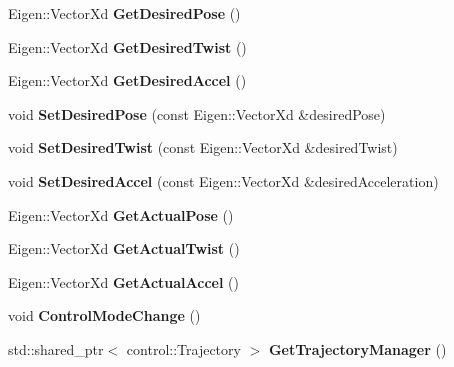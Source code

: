 \begin{DoxyCompactItemize}
Eigen\+::\+Vector\+Xd {\bfseries Get\+Desired\+Pose} ()
\item 
\mbox{\label{classproc__control_1_1_robot_state_ad4e53481ed7a527dd14cb38b14c5f3e2}} 
Eigen\+::\+Vector\+Xd {\bfseries Get\+Desired\+Twist} ()
\item 
\mbox{\label{classproc__control_1_1_robot_state_a4d4b5d2c9d2a52dd74f96379142a0517}} 
Eigen\+::\+Vector\+Xd {\bfseries Get\+Desired\+Accel} ()
\item 
\mbox{\label{classproc__control_1_1_robot_state_a3104336143109ecbc3e959685fdeb4a2}} 
void {\bfseries Set\+Desired\+Pose} (const Eigen\+::\+Vector\+Xd \&desired\+Pose)
\item 
\mbox{\label{classproc__control_1_1_robot_state_a77153e9de4974df397888c7d282a1b68}} 
void {\bfseries Set\+Desired\+Twist} (const Eigen\+::\+Vector\+Xd \&desired\+Twist)
\item 
\mbox{\label{classproc__control_1_1_robot_state_a44dfd68347df8a8cd33bab29ecaaad8b}} 
void {\bfseries Set\+Desired\+Accel} (const Eigen\+::\+Vector\+Xd \&desired\+Acceleration)
\item 
\mbox{\label{classproc__control_1_1_robot_state_a073a0c96d58c0426b2c8742fbeb13bc2}} 
Eigen\+::\+Vector\+Xd {\bfseries Get\+Actual\+Pose} ()
\item 
\mbox{\label{classproc__control_1_1_robot_state_abe2148b4e14759c38e44a8e4b0b64656}} 
Eigen\+::\+Vector\+Xd {\bfseries Get\+Actual\+Twist} ()
\item 
\mbox{\label{classproc__control_1_1_robot_state_aeca602d23415a3f441acbf1696b659c7}} 
Eigen\+::\+Vector\+Xd {\bfseries Get\+Actual\+Accel} ()
\item 
\mbox{\label{classproc__control_1_1_robot_state_a3b02a089ce6fff2a4f87668353a129ce}} 
void {\bfseries Control\+Mode\+Change} ()
\item 
\mbox{\label{classproc__control_1_1_robot_state_a9a89078f52719b9c3a99104658e88a0e}} 
std\+::shared\+\_\+ptr$<$ control\+::\+Trajectory $>$ {\bfseries Get\+Trajectory\+Manager} ()
\end{DoxyCompactItemize}


